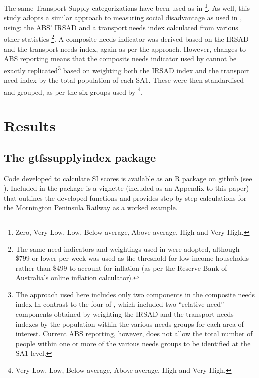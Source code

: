 \documentclass[preprint, 3p,
authoryear]{elsarticle} %
\begin{document}
The same Transport Supply categorizations have been used as in
\citet{currie2010identifying}\footnote{Zero, Very Low, Low, Below
  average, Above average, High and Very High.}. As well, this study
adopts a similar approach to measuring social disadvantage as used in
\citet{currie2010identifying}, using: the ABS' IRSAD and a transport
needs index calculated from various other statistics \footnote{The same
  need indicators and weightings used in \citet{currie2010identifying}
  were adopted, although \$799 or lower per week was used as the
  threshold for low income households rather than \$499 to account for
  inflation (as per the Reserve Bank of Australia's online inflation
  calculator).}. A composite needs indicator was derived based on the
IRSAD and the transport needs index, again as per the
\citet{currie2010identifying} approach. However, changes to ABS
reporting means that the composite needs indicator used by
\citet{currie2010identifying} cannot be exactly replicated\footnote{The
  approach used here includes only two components in the composite needs
  index In contrast to the four of \citet{currie2010identifying}, which
  included two ``relative need'' components obtained by weighting the
  IRSAD and the transport needs indexes by the population within the
  various needs groups for each area of interest. Current ABS reporting,
  however, does not allow the total number of people within one or more
  of the various needs groups to be identified at the SA1 level.} based
on weighting both the IRSAD index and the transport need index by the
total population of each SA1. These were then standardised and grouped,
as per the six groups used by \citet{currie2010identifying}\footnote{Very
  Low, Low, Below average, Above average, High and Very High.}.

\section{Results}\label{results}

\subsection{The gtfssupplyindex
package}\label{the-gtfssupplyindex-package}

Code developed to calculate SI scores is available as an R package on
github (see \citet{gtfssupplyindex_github}). Included in the package is
a vignette (included as an Appendix to this paper) that outlines the
developed functions and provides step-by-step calculations for the
Mornington Peninsula Railway as a worked example.
\end{document}
